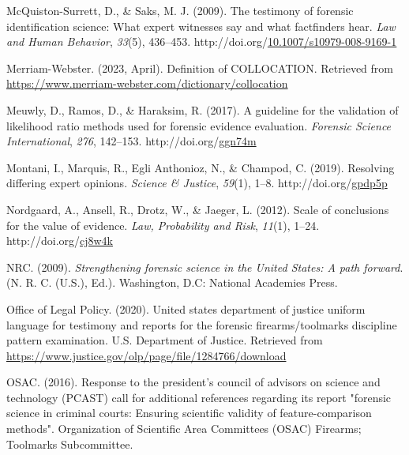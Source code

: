 \documentclass[print]{nuthesis}
\newlength{\cslhangindent}
\newenvironment{CSLReferences}[2]%
{\setlength{\parindent}{0pt}%
\everypar{\setlength{\hangindent}{\cslhangindent}}\ignorespaces}%
{\par}
\begin{document}
\begin{CSLReferences}{1}{0}
\leavevmode{}%
McQuiston-Surrett, D., \& Saks, M. J. (2009). The testimony of forensic identification science: {What} expert witnesses say and what factfinders hear. \emph{Law and Human Behavior}, \emph{33}(5), 436--453. http://doi.org/\href{https://doi.org/10.1007/s10979-008-9169-1}{10.1007/s10979-008-9169-1}

\leavevmode{}%
Merriam-Webster. (2023, April). Definition of {COLLOCATION}. Retrieved from \url{https://www.merriam-webster.com/dictionary/collocation}

\leavevmode{}%
Meuwly, D., Ramos, D., \& Haraksim, R. (2017). A guideline for the validation of likelihood ratio methods used for forensic evidence evaluation. \emph{Forensic Science International}, \emph{276}, 142--153. http://doi.org/\href{https://doi.org/ggn74m}{ggn74m}

\leavevmode{}%
Montani, I., Marquis, R., Egli Anthonioz, N., \& Champod, C. (2019). Resolving differing expert opinions. \emph{Science \& Justice}, \emph{59}(1), 1--8. http://doi.org/\href{https://doi.org/gpdp5p}{gpdp5p}

\leavevmode{}%
Nordgaard, A., Ansell, R., Drotz, W., \& Jaeger, L. (2012). Scale of conclusions for the value of evidence. \emph{Law, Probability and Risk}, \emph{11}(1), 1--24. http://doi.org/\href{https://doi.org/cj8w4k}{cj8w4k}

\leavevmode{}%
NRC. (2009). \emph{Strengthening forensic science in the {United} {States}: A path forward}. (N. R. C. (U.S.), Ed.). Washington, D.C: National Academies Press.

\leavevmode{}%
Office of Legal Policy. (2020). United states department of justice uniform language for testimony and reports for the forensic firearms/toolmarks discipline pattern examination. U.S. Department of Justice. Retrieved from \url{https://www.justice.gov/olp/page/file/1284766/download}

\leavevmode{}%
OSAC. (2016). Response to the president's council of advisors on science and technology (PCAST) call for additional references regarding its report "forensic science in criminal courts: Ensuring scientific validity of feature-comparison methods". Organization of Scientific Area Committees (OSAC) Firearms; Toolmarks Subcommittee.


\end{CSLReferences}
\end{document}
